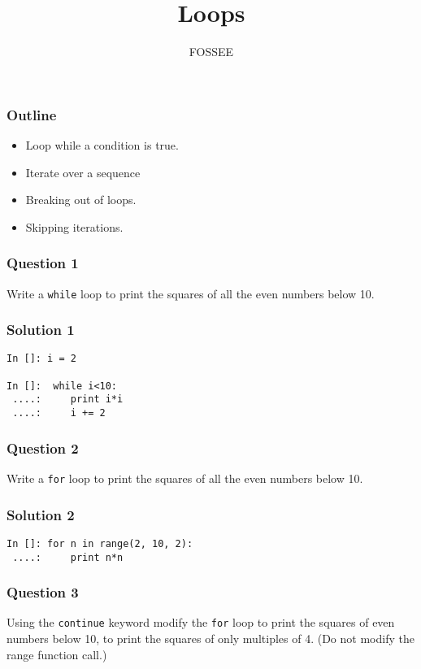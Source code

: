 \documentclass[presentation]{beamer}
\title{Loops}
\author{FOSSEE}
\date{}
\begin{document}
\maketitle









\begin{frame}
\frametitle{Outline}
\label{sec-1}

\begin{itemize}
\item Loop while a condition is true.
\item Iterate over a sequence
\item Breaking out of loops.
\item Skipping iterations.
\end{itemize}
\end{frame}
\begin{frame}
\frametitle{Question 1}
\label{sec-2}

  Write a \texttt{while} loop to print the squares of all the even
  numbers below 10. 
\end{frame}
\begin{frame}[fragile]
\frametitle{Solution 1}
\label{sec-3}

\begin{verbatim}
In []: i = 2

In []:  while i<10:
 ....:     print i*i
 ....:     i += 2
\end{verbatim}
\end{frame}
\begin{frame}
\frametitle{Question 2}
\label{sec-4}

  Write a \texttt{for} loop to print the squares of all the even numbers
  below 10.
\end{frame}
\begin{frame}[fragile]
\frametitle{Solution 2}
\label{sec-5}

\begin{verbatim}
In []: for n in range(2, 10, 2):
 ....:     print n*n
\end{verbatim}
\end{frame}
\begin{frame}
\frametitle{Question 3}
\label{sec-6}

  Using the \texttt{continue} keyword modify the \texttt{for} loop to print the
  squares of even numbers below 10, to print the squares of only
  multiples of 4. (Do not modify the range function call.)
\end{frame}
\end{document}
